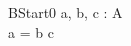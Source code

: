 \begin{zed}
[A]
\end{zed}

\begin{schema}{BStart0}
  a, b, c : \seq A \\
\where
  a = b \cat c \\
\end{schema}
